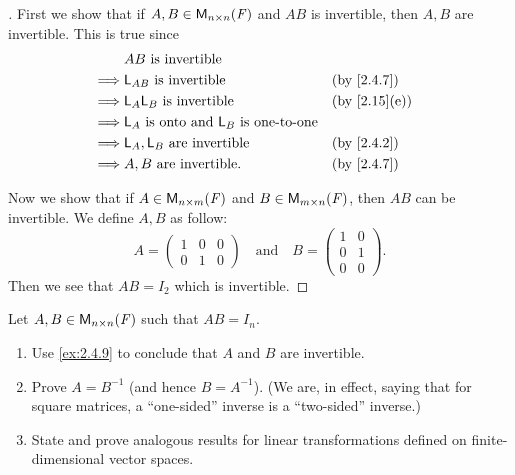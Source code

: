 \begin{proof}[]
  First we show that if \(A, B \in \mathsf{M}_{{n} \times n}({\mathit{F}})\) and \(AB\) is invertible, then \(A, B\) are invertible.
  This is true since
  \begin{align*}
             & AB \text{ is invertible}                                                             \\
    \implies & \L_{AB} \text{ is invertible}                        &  & \text{(by \cref{2.4.7})}   \\
    \implies & \L_A \L_B \text{ is invertible}                      &  & \text{(by \cref{2.15}(e))} \\
    \implies & \L_A \text{ is onto and } \L_B \text{ is one-to-one}                                 \\
    \implies & \L_A, \L_B \text{ are invertible}                    &  & \text{(by \cref{2.4.2})}   \\
    \implies & A, B \text{ are invertible}.                         &  & \text{(by \cref{2.4.7})}
  \end{align*}

  Now we show that if \(A \in \mathsf{M}_{{n} \times m}({\mathit{F}})\) and \(B \in \mathsf{M}_{{m} \times n}({\mathit{F}})\), then \(AB\) can be invertible.
  We define \(A, B\) as follow:
  \[
    A = \begin{pmatrix}
      1 & 0 & 0 \\
      0 & 1 & 0
    \end{pmatrix} \quad \text{and} \quad B = \begin{pmatrix}
      1 & 0 \\
      0 & 1 \\
      0 & 0
    \end{pmatrix}.
  \]
  Then we see that \(AB = I_2\) which is invertible.
\end{proof}

\begin{ex}\label{ex:2.4.10}
  Let \(A, B \in \mathsf{M}_{{n} \times n}({\mathit{F}})\) such that \(AB = I_n\).
  \begin{enumerate}
    \item Use \cref{ex:2.4.9} to conclude that \(A\) and \(B\) are invertible.
    \item Prove \(A = B^{-1}\) (and hence \(B = A^{-1}\)).
          (We are, in effect, saying that for square matrices, a ``one-sided'' inverse is a ``two-sided'' inverse.)
    \item State and prove analogous results for linear transformations defined on finite-dimensional vector spaces.
  \end{enumerate}
\end{ex}

